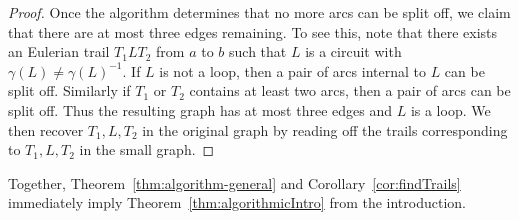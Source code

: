 \documentclass[a4paper, 12pt]{article}
\begin{document}
\begin{proof}
    Once the algorithm determines that no more arcs can be split off, we claim that there are at most three edges remaining. To see this, note that there exists an Eulerian trail $T_1LT_2$ from $a$ to $b$ such that $L$ is a circuit with $\gamma(L) \neq \gamma(L)^{-1}$. If $L$ is not a loop, then a pair of arcs internal to $L$ can be split off. Similarly if $T_1$ or $T_2$ contains at least two arcs, then a pair of arcs can be split off. Thus the resulting graph has at most three edges and $L$ is a loop. We then recover $T_1, L, T_2$ in the original graph by reading off the trails corresponding to $T_1,L,T_2$ in the small graph.
\end{proof}

Together, Theorem~\ref{thm:algorithm-general} and Corollary~\ref{cor:findTrails} immediately imply Theorem~\ref{thm:algorithmicIntro} from the introduction.




\end{document}
